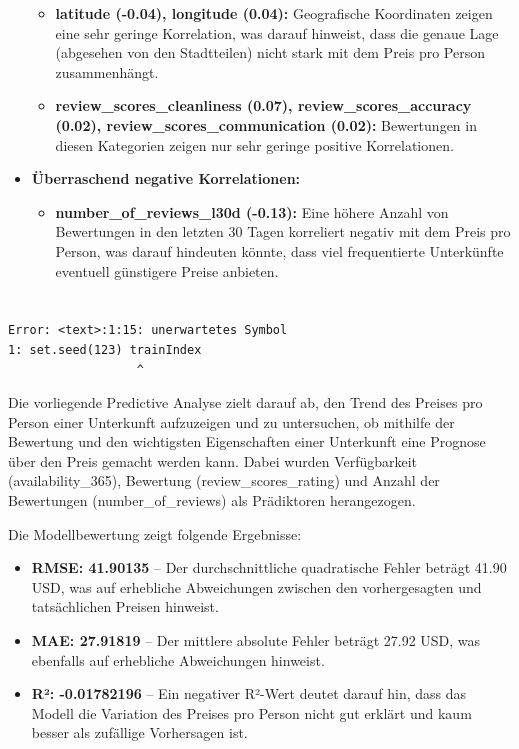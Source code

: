 \documentclass[
  journal,
]{IEEEtran}%
\providecommand{\tightlist}{%
  \setlength{\itemsep}{0pt}\setlength{\parskip}{0pt}}\usepackage{longtable,booktabs,array}
\begin{document}
\begin{itemize}
  \begin{itemize}
  \item
    \textbf{latitude (-0.04), longitude (0.04):} Geografische
    Koordinaten zeigen eine sehr geringe Korrelation, was darauf
    hinweist, dass die genaue Lage (abgesehen von den Stadtteilen) nicht
    stark mit dem Preis pro Person zusammenhängt.
  \item
    \textbf{review\_scores\_cleanliness (0.07), review\_scores\_accuracy
    (0.02), review\_scores\_communication (0.02):} Bewertungen in diesen
    Kategorien zeigen nur sehr geringe positive Korrelationen.
  \end{itemize}
\item
  \textbf{Überraschend negative Korrelationen:}

  \begin{itemize}
  \tightlist
  \item
    \textbf{number\_of\_reviews\_l30d (-0.13):} Eine höhere Anzahl von
    Bewertungen in den letzten 30 Tagen korreliert negativ mit dem Preis
    pro Person, was darauf hindeuten könnte, dass viel frequentierte
    Unterkünfte eventuell günstigere Preise anbieten.
  \end{itemize}
\end{itemize}

\section{}\label{section}

\begin{verbatim}
Error: <text>:1:15: unerwartetes Symbol
1: set.seed(123) trainIndex
                  ^
\end{verbatim}

Die vorliegende Predictive Analyse zielt darauf ab, den Trend des
Preises pro Person einer Unterkunft aufzuzeigen und zu untersuchen, ob
mithilfe der Bewertung und den wichtigsten Eigenschaften einer
Unterkunft eine Prognose über den Preis gemacht werden kann. Dabei
wurden Verfügbarkeit (availability\_365), Bewertung
(review\_scores\_rating) und Anzahl der Bewertungen
(number\_of\_reviews) als Prädiktoren herangezogen.

Die Modellbewertung zeigt folgende Ergebnisse:

\begin{itemize}
\item
  \textbf{RMSE: 41.90135} -- Der durchschnittliche quadratische Fehler
  beträgt 41.90 USD, was auf erhebliche Abweichungen zwischen den
  vorhergesagten und tatsächlichen Preisen hinweist.
\item
  \textbf{MAE: 27.91819} -- Der mittlere absolute Fehler beträgt 27.92
  USD, was ebenfalls auf erhebliche Abweichungen hinweist.
\item
  \textbf{R²: -0.01782196} -- Ein negativer R²-Wert deutet darauf hin,
  dass das Modell die Variation des Preises pro Person nicht gut erklärt
  und kaum besser als zufällige Vorhersagen ist.
\end{itemize}
\end{document}
